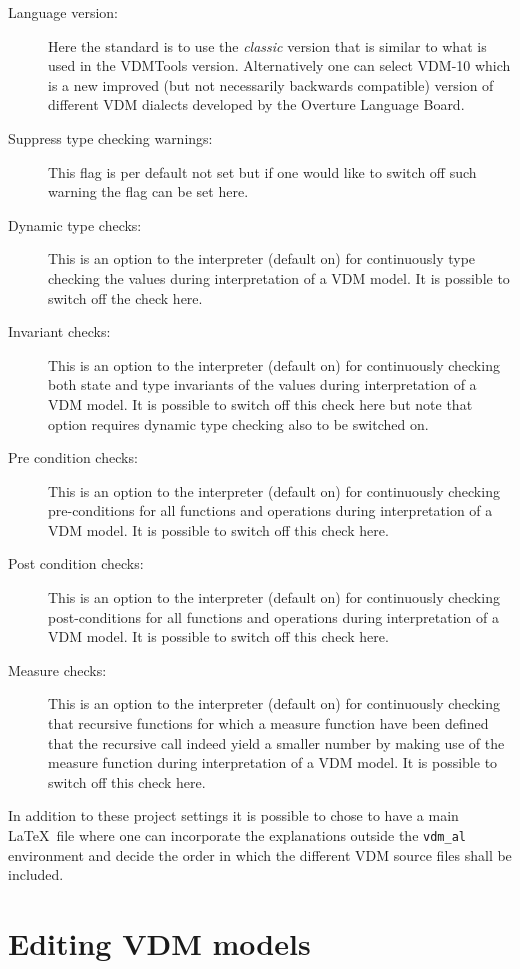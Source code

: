 \documentclass{overturerepchap}
\begin{document}
\begin{description}
\item[Language version:] Here the standard is to use the
  \emph{classic} version that is similar to what is used in the
  VDMTools version. Alternatively one can select VDM-10 which
  is a new improved (but not necessarily backwards compatible) version of
  different VDM dialects developed by the Overture Language Board. 
\item[Suppress type checking warnings:] This flag is per default not
  set but if one would like to switch off such warning the flag can be
  set here.
\item[Dynamic type checks:] This is an option to the interpreter (default on) 
  for continuously type checking the values
  during interpretation of a VDM model. It is possible to switch off
  the check here.
\item[Invariant checks:] This is an option to the interpreter (default on) 
  for continuously checking both state and type invariants of the values
  during interpretation of a VDM model. It is possible to switch off
  this check here but note that option requires dynamic type
  checking also to be switched on.
\item[Pre condition checks:] This is an option to the interpreter (default on) 
  for continuously checking pre-conditions for all functions and operations
  during interpretation of a VDM model. It is possible to switch off
  this check here.
\item[Post condition checks:] This is an option to the interpreter (default on) 
  for continuously checking post-conditions for all functions and operations
  during interpretation of a VDM model. It is possible to switch off
  this check here.
\item[Measure checks:] This is an option to the interpreter (default
  on) for continuously checking that recursive functions for which a
  measure function have been defined that the recursive call indeed
  yield a smaller number by making use of the measure function during
  interpretation of a VDM model. It is possible to switch off this
  check here.
\end{description}

In addition to these project settings it is possible to chose to have
a main \LaTeX\ file where one can incorporate the explanations outside
the \texttt{vdm\_al} environment and decide the order in which the
different VDM source files shall be included.

\chapter{Editing VDM models}\label{sec:editVDM}
\end{document}
